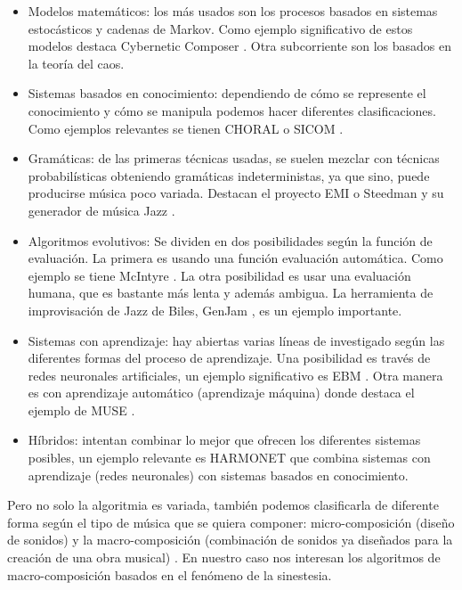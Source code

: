 \color{blue}
\begin{itemize}
	\item Modelos matemáticos: los más usados son los procesos basados en sistemas estocásticos y cadenas de Markov. Como ejemplo significativo de estos modelos destaca Cybernetic Composer \cite{AIMusicSurvey}. Otra subcorriente son los basados en la teoría del caos.
	\item Sistemas basados en conocimiento: dependiendo de cómo se represente el conocimiento y cómo se manipula podemos hacer diferentes clasificaciones. Como ejemplos relevantes se tienen CHORAL \cite{HistoryAlgorithmicComp} o SICOM \cite{SICOM}.
	\item Gramáticas: de las primeras técnicas usadas, se suelen mezclar con técnicas probabilísticas obteniendo gramáticas indeterministas, ya que sino, puede producirse música poco variada. Destacan el proyecto EMI \cite{HistoryAlgorithmicComp} o Steedman y su generador de música Jazz \cite{AIMethodsForComposition}.
	\item Algoritmos evolutivos: Se dividen en dos posibilidades según la función de evaluación. La primera es usando una función evaluación automática. Como ejemplo se tiene McIntyre \cite{AIMethodsForComposition}. La otra posibilidad es usar una evaluación humana, que es bastante más lenta y además ambigua. La herramienta de improvisación de Jazz de Biles, GenJam \cite{GenJam}, es un ejemplo importante.
	\item Sistemas con aprendizaje: hay abiertas varias líneas de investigado según las diferentes formas del proceso de aprendizaje. Una posibilidad es través de redes neuronales artificiales, un ejemplo significativo es EBM \cite{AIMethodsForComposition}. Otra manera es con aprendizaje automático (aprendizaje máquina) donde destaca el ejemplo de MUSE \cite{AIMethodsForComposition}.
	\item Híbridos: intentan combinar lo mejor que ofrecen los diferentes sistemas posibles, un ejemplo relevante es HARMONET \cite{AIMethodsForComposition} que combina sistemas con aprendizaje (redes neuronales) con sistemas basados en conocimiento.\\
\end{itemize}
\color{black}

Pero no solo la algoritmia es variada, también podemos clasificarla de diferente forma según el tipo de música que se quiera componer: micro-composición (diseño de sonidos) y la macro-composición (combinación de sonidos ya diseñados para la creación de una obra musical) \cite{AudioVisualSurvey}. En nuestro caso nos interesan los algoritmos de macro-composición basados en el fenómeno de la sinestesia.\\ 

